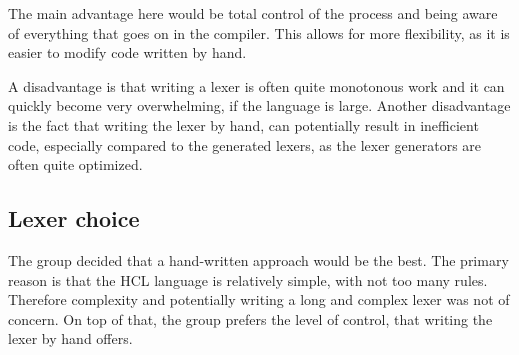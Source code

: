 The main advantage here would be total control of the process and being aware of everything that goes on in the compiler. 
This allows for more flexibility, as it is easier to modify code written by hand.

A disadvantage is that writing a lexer is often quite monotonous work and it can quickly become very overwhelming, if the language is large.
Another disadvantage is the fact that writing the lexer by hand, can potentially result in inefficient code, especially compared to the generated lexers, as the lexer generators are often quite optimized.

\subsection{Lexer choice}
\label{LexerChoice}
The group decided that a hand-written approach would be the best.
The primary reason is that the HCL language is relatively simple, with not too many rules.
Therefore complexity and potentially writing a long and complex lexer was not of concern.
On top of that, the group prefers the level of control, that writing the lexer by hand offers.


